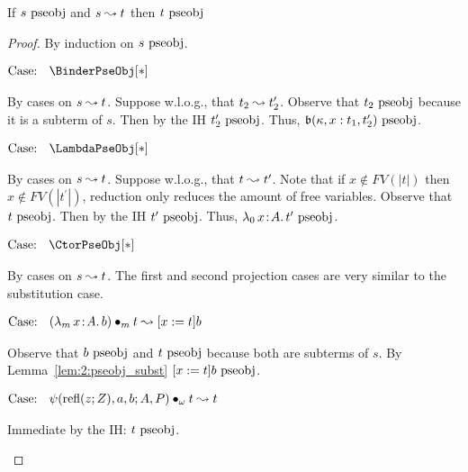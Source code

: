 \begin{lemma}
    \label{lem:2:pseobj_preservation_step}
    If $s~\textnormal{pseobj}$ and $s \leadsto t$ then $t~\textnormal{pseobj}$
\end{lemma}
\begin{proof}
    By induction on $s~\textnormal{pseobj}$.

    $\text{Case: }\begin{array}{c} \BinderPseObj[*] \end{array}$
    \begin{proofcase}
        By cases on $s \leadsto t$. Suppose w.l.o.g., that $t_2 \leadsto t_2^\prime$.
        Observe that $t_2~\textnormal{pseobj}$ because it is a subterm of $s$.
        Then by the IH $t_2^\prime~\textnormal{pseobj}$.
        Thus, $\mathfrak{b}(\kappa, x : t_1, t_2^\prime) ~\textnormal{pseobj}$.
    \end{proofcase}

    $\text{Case: }\begin{array}{c} \LambdaPseObj[*] \end{array}$
    \begin{proofcase}
        By cases on $s \leadsto t$. Suppose w.l.o.g., that $t \leadsto t^\prime$.
        Note that if $x \notin FV(|t|)$ then $x \notin FV(|t^\prime|)$, reduction only reduces the amount of free variables.
        Observe that $t ~\textnormal{pseobj}$.
        Then by the IH $t^\prime~\textnormal{pseobj}$.
        Thus, ${\lambda_0}\, x\! : \! A.\, t^\prime~\textnormal{pseobj}$.
    \end{proofcase}

    $\text{Case: }\begin{array}{c} \CtorPseObj[*] \end{array}$
    \begin{proofcase}
        By cases on $s \leadsto t$.
        The first and second projection cases are very similar to the substitution case.

        $\text{Case: }\begin{array}{c} ({\lambda_m}\, x\! : \! A.\, b) \bullet_{m} t \leadsto [x := t]b \end{array}$
        \begin{proofcase}
            Observe that $b~\textnormal{pseobj}$ and $t~\textnormal{pseobj}$ because both are subterms of $s$.
            By Lemma~\ref{lem:2:pseobj_subst} $[x := t]b~\textnormal{pseobj}$.
        \end{proofcase}

        $\text{Case: }\begin{array}{c} \psi(\text{refl}(z;Z), a, b; A, P) \bullet_{\omega} t \leadsto t \end{array}$
        \begin{proofcase}
            Immediate by the IH: $t~\textnormal{pseobj}$.
        \end{proofcase}


\end{proofcase}
\end{proof}
